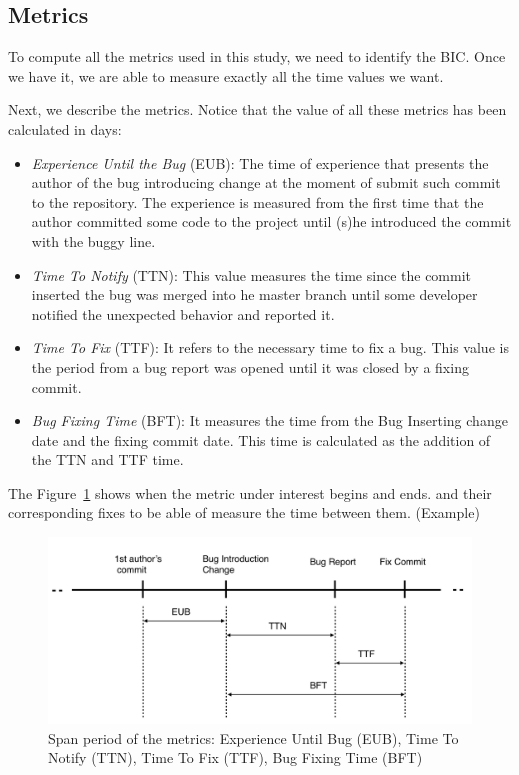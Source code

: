 \documentclass[10pt, conference]{IEEEtran}
\begin{document}
\subsection{Metrics}

To compute all the metrics used in this study, we need to identify the BIC. Once we have it, we are able to measure exactly all the time values we want.  

Next, we describe the metrics. Notice that the value of all these metrics has been calculated in days: 

\begin{itemize}
		\item \emph{Experience Until the Bug} (EUB): The time of experience that presents the author of the bug introducing change at the moment of submit such commit to the repository. The experience is measured from the first time that the author committed some code to the project until (s)he introduced the commit with the buggy line.
		\item \emph{Time To Notify} (TTN): This value measures the time since the commit inserted the bug was merged into he master branch until some developer notified the unexpected behavior and reported it. 
		\item \emph{Time To Fix} (TTF): It refers to the necessary time to fix a bug. This value is the period from a bug report was opened until it was closed by a fixing commit.
		\item \emph{Bug Fixing Time} (BFT): It measures the time from the Bug Inserting change date and the fixing commit date. This time is calculated as the addition of the TTN and TTF time.
\end{itemize} 

The Figure~\ref{fig:metrics} shows when the metric under interest begins and ends. and their corresponding fixes to be able of measure the time between them. (Example)

\begin{figure}[ht]
\centering
\includegraphics[width=\columnwidth]{metrics.png}
\caption{ Span period of the metrics: Experience Until Bug (EUB),  Time To Notify (TTN), Time To Fix (TTF), Bug Fixing Time (BFT) }
\label{fig:metrics}       %
\end{figure}
\end{document}
